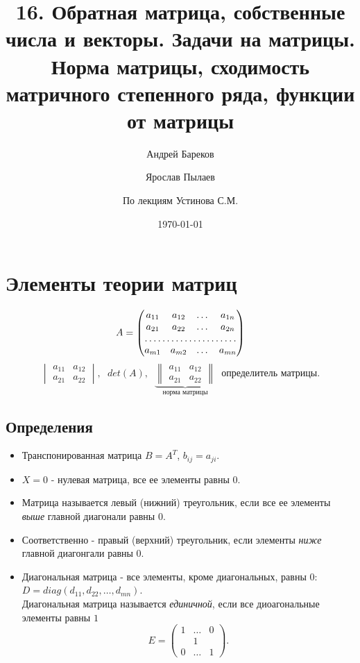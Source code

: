 \documentclass[a4paper,11pt]{article}
\title{16. Обратная матрица, собственные числа и векторы. Задачи на матрицы.
       Норма матрицы, сходимость матричного степенного ряда, функции от матрицы}
\author{Андрей Бареков \and Ярослав Пылаев \and По лекциям Устинова С.М.}
\date{\today}
\begin{document}
\maketitle
\newpage

\section{Элементы теории матриц}
\begin{equation*}
  A =
  \begin{pmatrix}
    a_{11} & a_{12} & \dots & a_{1n} \\
    a_{21} & a_{22} & \dots & a_{2n} \\
    \hdotsfor{4} \\
    a_{m1} & a_{m2} & \dots & a_{mn}
  \end{pmatrix}
\end{equation*}
\begin{equation*}
  \begin{vmatrix}
    a_{11} & a_{12} \\
    a_{21} & a_{22}
  \end{vmatrix}
  ,\hspace{7pt}
  det(A), \hspace{7pt}
  \underbrace
  {
    \begin{Vmatrix}
      a_{11} & a_{12} \\
      a_{21} & a_{22}
    \end{Vmatrix}
  }_{\text{норма матрицы}}
  \hspace{7pt} \text{определитель матрицы}.
\end{equation*}
\subsection{Определения}
\begin{itemize}
  \item Транспонированная матрица $B = A^T$, $b_{ij}=a_{ji}$.
  \item $X=0$ - нулевая матрица, все ее элементы равны $0$.
  \item Матрица называется левый (нижний) треугольник, если все ее элементы \textit{выше} главной диагонали равны $0$.
  \item Соответственно - правый (верхний) треугольник, если элементы \textit{ниже} главной диагонгали равны $0$.
  \item Диагональная матрица - все элементы, кроме диагональных, равны $0$:
    $D = diag(d_{11}, d_{22},\dots, d_{mn})$. \\
    Диагональная матрица называется \textit{единичной}, если все диоагональные элементы равны $1$
    \begin{equation*}
      E =
      \begin{pmatrix}
        1 & \dots & 0 \\
         & 1 &  \\
        0 & \dots & 1
      \end{pmatrix}
      .
    \end{equation*}
\end{itemize}
\end{document}
